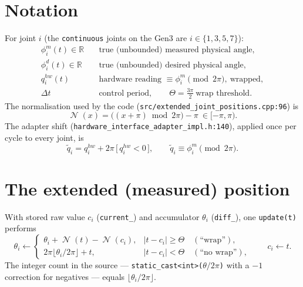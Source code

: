\documentclass[11pt]{article}
\newcommand{\R}{\mathbb{R}}
\DeclareMathOperator{\Nrm}{\mathcal{N}}
\begin{document}
\section{Notation}

For joint $i$ (the \texttt{continuous} joints on the Gen3 are
$i\in\{1,3,5,7\}$):
\begin{align*}
\phi^m_i(t)\in\R &\quad\text{true (unbounded) measured physical angle},\\
\phi^d_i(t)\in\R &\quad\text{true (unbounded) desired physical angle},\\
q^{hw}_i(t)      &\quad\text{hardware reading }\equiv\phi^m_i \!\!\pmod{2\pi},\ \text{wrapped},\\
\Delta t         &\quad\text{control period},\qquad \Theta=\tfrac{3\pi}{2}\ \text{wrap threshold}.
\end{align*}
The normalisation used by the code
(\texttt{src/extended\_joint\_positions.cpp:96}) is
\begin{equation}
\Nrm(x)=\big((x+\pi)\bmod 2\pi\big)-\pi\ \in[-\pi,\pi).
\end{equation}
The adapter shift (\texttt{hardware\_interface\_adapter\_impl.h:140}),
applied once per cycle to every joint, is
\begin{equation}
\label{eq:shift}
\tilde q_i = q^{hw}_i + 2\pi\,\big[\,q^{hw}_i<0\,\big],
\qquad \tilde q_i\equiv\phi^m_i\!\!\pmod{2\pi}.
\end{equation}

\section{The extended (measured) position}
\label{sec:ext}

With stored raw value $c_i$ (\texttt{current\_}) and accumulator
$\theta_i$ (\texttt{diff\_}), one \texttt{update(t)} performs
\begin{equation}
\label{eq:update}
\theta_i \leftarrow
\begin{cases}
\theta_i+\Nrm(t)-\Nrm(c_i), & |t-c_i|\ge\Theta \quad(\text{``wrap''}),\\[4pt]
2\pi\big\lfloor \theta_i/2\pi\big\rfloor + t, & |t-c_i|<\Theta \quad(\text{``no wrap''}),
\end{cases}
\qquad c_i\leftarrow t .
\end{equation}
The integer count in the source --- \texttt{static\_cast<int>($\theta/2\pi$)}
with a $-1$ correction for negatives --- equals $\lfloor\theta_i/2\pi\rfloor$.
\end{document}
